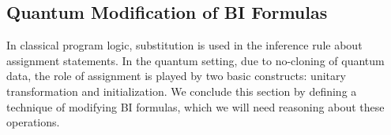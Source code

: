 \documentclass[conference,compsoc, 10pt]{IEEEtran}
\begin{document}
	
	
	\subsection{Quantum Modification of BI Formulas}
	\label{sec modification BI formulas}
  In classical program logic, substitution is used in the inference rule about
  assignment statements. In the quantum setting, due to no-cloning of quantum
  data, the role of assignment is played by two basic constructs: unitary
  transformation and initialization. We conclude this section by defining a
  technique of modifying BI formulas, which we will need reasoning about these
  operations.
	
\end{document}
